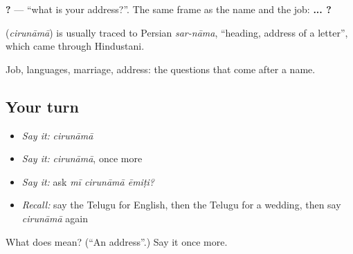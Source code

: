 \textbf{  ?} — \textquotedblleft{}what is your address?\textquotedblright{}. The same frame as the name and the job: \textbf{ ... ?}

\begin{cousinweb}
\textbf{} (\emph{cirunāmā}) is usually traced to Persian \emph{sar-nāma}, \textquotedblleft{}heading, address of a letter\textquotedblright{}, which came through Hindustani.
\end{cousinweb}

\begin{grammarlens}[title={What you've built}]
Job, languages, marriage, address: the questions that come after a name.
\end{grammarlens}

\subsection*{Your turn}
\begin{itemize}
\raggedright
  \item \emph{Say it:} \emph{cirunāmā}
  \item \emph{Say it:} \emph{cirunāmā}, once more
  \item \emph{Say it:} ask \emph{mī cirunāmā ēmiṭi?}
  \item \emph{Recall:} say the Telugu for English, then the Telugu for a wedding, then say \emph{cirunāmā} again
\end{itemize}

\begin{tcolorbox}[breakable,colback=teal!4,colframe=teal!35!black,title={Before you move on}]
What does  mean? (\textquotedblleft{}An address\textquotedblright{}.) Say it once more.
\end{tcolorbox}
